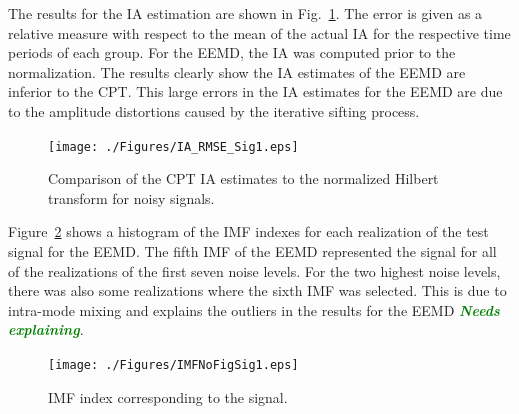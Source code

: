 \documentclass[a4paper]{IEEEtran}
\newcommand{\todo}[1]{\textsf{\emph{\textbf{\textcolor{blue}{#1}}}}}
\newcommand{\dean}[1]{\textsf{\emph{\textbf{\textcolor{green}{#1}}}}}
\begin{document}
The results for the IA estimation are shown in Fig.~\ref{fig:RMSEComparisonSig1_IA}. The error is given as a relative measure with respect to the mean of the actual IA for the respective time periods of each group. For the EEMD, the IA was computed prior to the normalization. The results clearly show the IA estimates of the EEMD are inferior to the CPT. This large errors in the IA estimates for the EEMD are due to the amplitude distortions caused by the iterative sifting process.  
\begin{figure}[!ht]\label{fig:RMSEComparisonSig1_IA}
    \centering
        \texttt{[image: ./Figures/IA\_RMSE\_Sig1.eps]}
    \caption{Comparison of the CPT IA estimates to the normalized Hilbert transform for noisy signals.}
\end{figure}
Figure~\ref{fig:IMFNoNHT} shows a histogram of the IMF indexes for each realization of the test signal for the EEMD. The fifth IMF of the EEMD represented the signal for all of the realizations of the first seven noise levels. For the two highest noise levels, there was also some realizations where the sixth IMF was selected. This is due to intra-mode mixing and explains the outliers in the results for the EEMD \dean{Needs explaining}.   
\begin{figure}[!ht]\label{fig:IMFNoNHT}
    \centering
        \texttt{[image: ./Figures/IMFNoFigSig1.eps]}
    \caption{IMF index corresponding to the signal.}
\end{figure}


\end{document}
